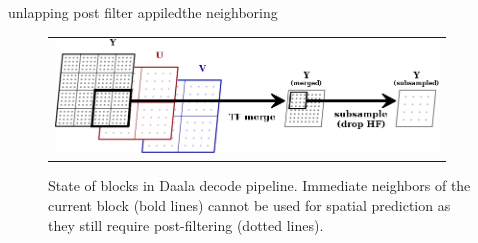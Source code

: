 \documentclass[a4paper]{spie}  %
\begin{document}
 unlapping post filter appiledthe neighboring \cite{oliv2011}\cite{xuwu2009}

\begin{figure}
\begin{center}
\begin{tabular}{c}
\includegraphics[natwidth=799,natheight=237,width=4in]{CfL-TF.png}
\end{tabular}
\end{center}
\caption[example]{\label{fig:tf} State of blocks in Daala decode pipeline.
 Immediate neighbors of the current block (bold lines) cannot be used for
 spatial prediction as they still require post-filtering (dotted lines).}
\end{figure}
\end{document}
